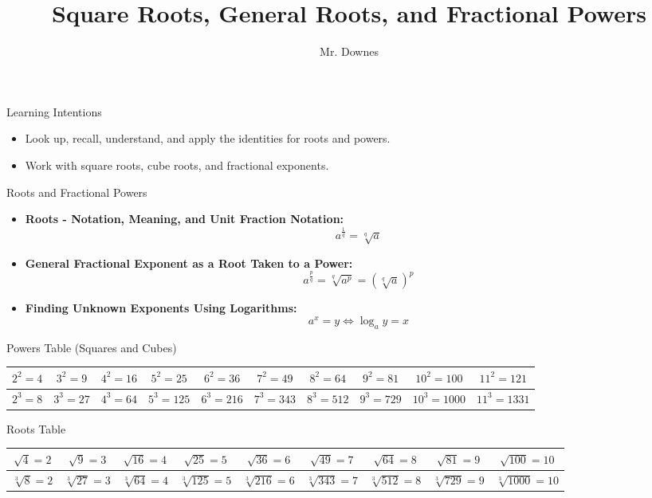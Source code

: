 \documentclass{beamer}
\title{\huge Square Roots, General Roots, and Fractional Powers}
\author{Mr. Downes}
\date{}
\begin{document}
\begin{frame}
  \titlepage
\end{frame}

\begin{frame}{\huge Learning Intentions}
  \begin{itemize}[<+-| alert@+>]
    \item Look up, recall, understand, and apply the identities for roots and powers.
    \item Work with square roots, cube roots, and fractional exponents.
  \end{itemize}
\end{frame}

\begin{frame}{\huge Roots and Fractional Powers}
\begin{itemize}
    \item \textbf{Roots - Notation, Meaning, and Unit Fraction Notation:} 
    \[
    a^{\frac{1}{q}} = \sqrt[q]{a}
    \]
    \item \textbf{General Fractional Exponent as a Root Taken to a Power:}
    \[
    a^{\frac{p}{q}} = \sqrt[q]{a^p} = \left( \sqrt[q]{a} \right)^p
    \]
    \item \textbf{Finding Unknown Exponents Using Logarithms:} 
    \[
    a^x = y \iff \log_a y = x
    \]
\end{itemize}
\end{frame}

\begin{frame}{\huge Powers Table (Squares and Cubes)}
\centering
\begin{tabular}{|c|c|c|c|c|c|c|c|c|c|}
\hline
$2^2 = 4$   & $3^2 = 9$   & $4^2 = 16$  & $5^2 = 25$  & $6^2 = 36$  & $7^2 = 49$  & $8^2 = 64$  & $9^2 = 81$  & $10^2 = 100$ & $11^2 = 121$ \\ \hline
$2^3 = 8$   & $3^3 = 27$  & $4^3 = 64$  & $5^3 = 125$ & $6^3 = 216$ & $7^3 = 343$ & $8^3 = 512$ & $9^3 = 729$ & $10^3 = 1000$ & $11^3 = 1331$ \\ \hline
\end{tabular}
\end{frame}

\begin{frame}{\huge Roots Table}
\centering
\begin{tabular}{|c|c|c|c|c|c|c|c|c|}
\hline
$\sqrt{4} = 2$   & $\sqrt{9} = 3$   & $\sqrt{16} = 4$  & $\sqrt{25} = 5$  & $\sqrt{36} = 6$  & $\sqrt{49} = 7$  & $\sqrt{64} = 8$  & $\sqrt{81} = 9$  & $\sqrt{100} = 10$ \\ \hline
$\sqrt[3]{8} = 2$   & $\sqrt[3]{27} = 3$  & $\sqrt[3]{64} = 4$  & $\sqrt[3]{125} = 5$ & $\sqrt[3]{216} = 6$ & $\sqrt[3]{343} = 7$ & $\sqrt[3]{512} = 8$ & $\sqrt[3]{729} = 9$ & $\sqrt[3]{1000} = 10$  \\ \hline
\end{tabular}
\end{frame}
\end{document}
